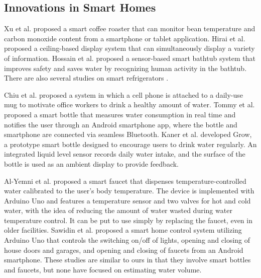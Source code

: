 \documentclass[sigconf]{acmart}
\begin{document}
\subsection{Innovations in Smart Homes}
Xu et al. \cite{smart_home1} proposed a smart coffee roaster that can monitor bean temperature and carbon monoxide content from a smartphone or tablet application.
Hirai et al. \cite{smart_home2} proposed a ceiling-based display system that can simultaneously display a variety of information.
Hossain et al. \cite{smart_home3} proposed a sensor-based smart bathtub system that improves safety and saves water by recognizing human activity in the bathtub.
There are also several studies on smart refrigerators \cite{smart_refrigerator1, smart_refrigerator2, smart_refrigerator3, smart_refrigerator4}. \par

Chiu et al. \cite{PlayfulBottle} proposed a system in which a cell phone is attached to a daily-use mug to motivate office workers to drink a healthy amount of water.
Tommy et al. \cite{SmartBottle} proposed a smart bottle that measures water consumption in real time and notifies the user through an Android smartphone app, where the bottle and smartphone are connected via seamless Bluetooth.
Kaner et al. \cite{GROW} developed Grow, a prototype smart bottle designed to encourage users to drink water regularly. An integrated liquid level sensor records daily water intake, and the surface of the bottle is used as an ambient display to provide feedback.\par

Al-Yemni et al. \cite{smart_faucet2} proposed a smart faucet that dispenses temperature-controlled water calibrated to the user’s body temperature. The device is implemented with Arduino Uno and features a temperature sensor and two valves for hot and cold water, with the idea of reducing the amount of water wasted during water temperature control. It can be put to use simply by replacing the faucet, even in older facilities.
Sawidin et al. \cite{smart_faucet3} proposed a smart home control system utilizing Arduino Uno that controls the switching on/off of lights, opening and closing of house doors and garages, and opening and closing of faucets from an Android smartphone.
These studies are similar to ours in that they involve smart bottles and faucets, but none have focused on estimating water volume.


\end{document}
